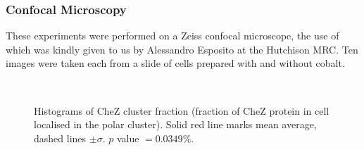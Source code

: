 \documentclass[../main.tex]{subfiles}
\begin{document}
\subsubsection{Confocal Microscopy}
\label{sec:results:cs:confocal}
These experiments were performed on a Zeiss confocal microscope, the use of which was kindly given to us by Alessandro Esposito at the Hutchison MRC. Ten images were taken each from a slide of cells prepared with and without cobalt.

\begin{figure}[h!]
\begin{center}
\\
\caption{Histograms of CheZ cluster fraction (fraction of CheZ protein in cell localised in the polar cluster). Solid red line marks mean average, dashed lines \(\pm\sigma\). \(p\) value \(=0.0349\%\).}
\label{fig:results:zeiss}
\end{center}
\end{figure}
\end{document}
